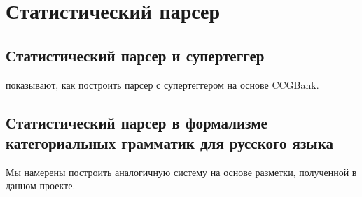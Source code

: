 \chapter{Статистический парсер}

\section{Статистический парсер и супертеггер}

\parencite{clark2007wide} показывают, как построить парсер с супертеггером на основе CCGBank. 

\section{Статистический парсер в формализме категориальных грамматик для русского языка}

Мы намерены построить аналогичную систему на основе разметки, полученной в данном проекте.
